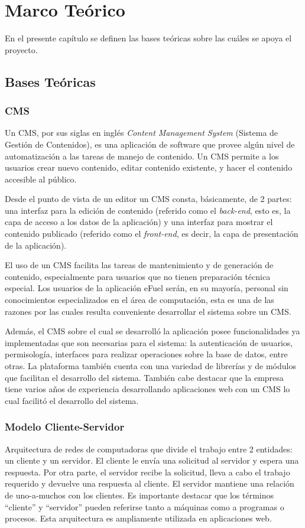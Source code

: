 \chapter{Marco Teórico}
En el presente capítulo se definen las bases teóricas sobre las cuáles se apoya el proyecto.

\section{Bases Teóricas}

\subsection{CMS}
Un CMS, por sus siglas en inglés \textit{Content Management System} (Sistema de Gestión de Contenidos), es una aplicación de software que provee algún nivel de automatización a las tareas de manejo de contenido. Un CMS permite a los usuarios crear nuevo contenido, editar contenido existente, y hacer el contenido accesible al público. \cite{cmsBarker}

Desde el punto de vista de un editor un CMS consta, básicamente, de 2 partes: una interfaz para la edición de contenido (referido como el \textit{back-end}, esto es, la capa de acceso a los datos de la aplicación) y una interfaz para mostrar el contenido publicado (referido como el \textit{front-end}, es decir, la capa de presentación de la aplicación).

El uso de un CMS facilita las tareas de mantenimiento y de generación de contenido, especialmente para usuarios que no tienen preparación técnica especial. Los usuarios de la aplicación eFuel serán, en su mayoría, personal sin conocimientos especializados en el área de computación, esta es una de las razones por las cuales resulta conveniente desarrollar el sistema sobre un CMS.

Además, el CMS sobre el cual se desarrolló la aplicación posee funcionalidades ya implementadas que son necesarias para el sistema: la autenticación de usuarios, permisología, interfaces para realizar operaciones sobre la base de datos, entre otras. La plataforma también cuenta con una variedad de librerías y de módulos que facilitan el desarrollo del sistema. También cabe destacar que la empresa tiene varios años de experiencia desarrollando aplicaciones web con un CMS lo cual facilitó el desarrollo del sistema.

\subsection{Modelo Cliente-Servidor}
Arquitectura de redes de computadoras que divide el trabajo entre 2 entidades: un cliente y un servidor. El cliente le envía una solicitud al servidor y espera una respuesta. Por otra parte, el servidor recibe la solicitud, lleva a cabo el trabajo requerido y devuelve una respuesta al cliente. \cite{redesTanenbaum} El servidor mantiene una relación de uno-a-muchos con los clientes. Es importante destacar que los términos “cliente” y “servidor” pueden referirse tanto a máquinas como a programas o procesos. Esta arquitectura es ampliamente utilizada en aplicaciones web.

